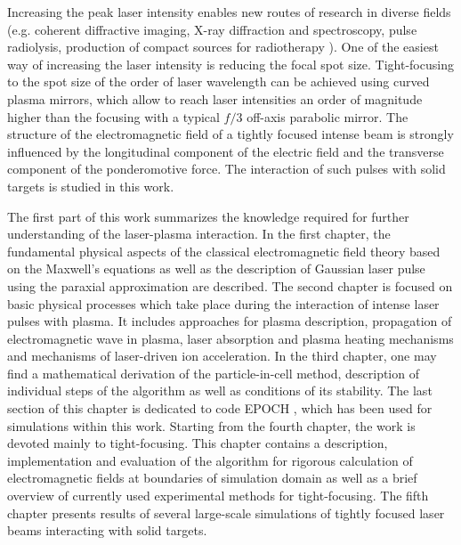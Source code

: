 Increasing the peak laser intensity enables new routes of research in diverse fields (e.g. coherent diffractive imaging, X-ray diffraction and spectroscopy, pulse radiolysis, production of compact sources for radiotherapy \cite{Zewail2010, Bulanov2004, Malka2004}). One of the easiest way of increasing the laser intensity is reducing the focal spot size. Tight-focusing to the spot size of the order of laser wavelength can be achieved using curved plasma mirrors, which allow to reach laser intensities an order of magnitude higher than the focusing with a typical $ f/3 $ off-axis parabolic mirror. The structure of the electromagnetic field of a tightly focused intense beam is strongly influenced by the longitudinal component of the electric field and the transverse component of the ponderomotive force. The interaction of such pulses with solid targets is studied in this work.

The first part of this work summarizes the knowledge required for further understanding of the laser-plasma interaction. In the first chapter, the fundamental physical aspects of the classical electromagnetic field theory \cite{Stratton2007, Jackson2005, Feynman1963, Thide2011} based on the Maxwell's equations as well as the description of Gaussian laser pulse using the paraxial approximation \cite{Born2013} are described. The second chapter is focused on basic physical processes which take place during the interaction of intense laser pulses with plasma. It includes approaches for plasma description, propagation of electromagnetic wave in plasma, laser absorption and plasma heating mechanisms and mechanisms of laser-driven ion acceleration. In the third chapter, one may find a mathematical derivation of the particle-in-cell method, description of individual steps of the algorithm as well as conditions of its stability. The last section of this chapter is dedicated to code EPOCH \cite{bennett}, which has been used for simulations within this work. Starting from the fourth chapter, the work is devoted mainly to tight-focusing. This chapter contains a description, implementation and evaluation of the algorithm for rigorous calculation of electromagnetic fields at boundaries of simulation domain \cite{Thiele2016} as well as a brief overview of currently used experimental methods for tight-focusing. The fifth chapter presents results of several large-scale simulations of tightly focused laser beams interacting with solid targets.

